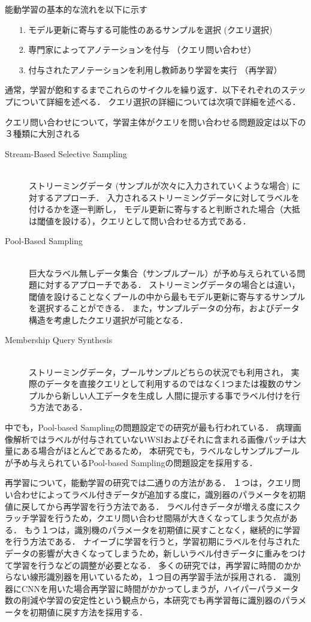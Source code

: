 能動学習の基本的な流れを以下に示す
\begin{itemize}
    \item[1.] モデル更新に寄与する可能性のあるサンプルを選択 (クエリ選択)
    \item[2.] 専門家によってアノテーションを付与 （クエリ問い合わせ）
    \item[3.] 付与されたアノテーションを利用し教師あり学習を実行 （再学習）
\end{itemize}
通常，学習が飽和するまでこれらのサイクルを繰り返す．以下それぞれのステップについて詳細を述べる．
クエリ選択の詳細については次項で詳細を述べる． 

クエリ問い合わせについて，学習主体がクエリを問い合わせる問題設定は以下の３種類に大別される
\begin{description}
    \item[Stream-Based Selective Sampling]\mbox{}\\
        ストリーミングデータ (サンプルが次々に入力されていくような場合) に対するアプローチ．
        入力されるストリーミングデータに対してラベルを付けるかを逐一判断し，
        モデル更新に寄与すると判断された場合（大抵は閾値を設ける），クエリとして問い合わせる方式である．
    \item[Pool-Based Sampling]\mbox{}\\
        巨大なラベル無しデータ集合（サンプルプール）が予め与えられている問題に対するアプローチである．
        ストリーミングデータの場合とは違い，閾値を設けることなくプールの中から最もモデル更新に寄与するサンプルを選択することができる．
        また，サンプルデータの分布，およびデータ構造を考慮したクエリ選択が可能となる．
    \item[Membership Query Synthesis]\mbox{}\\ 
        ストリーミングデータ，プールサンプルどちらの状況でも利用され，
        実際のデータを直接クエリとして利用するのではなく1つまたは複数のサンプルから新しい人工データを生成し
        人間に提示する事でラベル付けを行う方法である．
\end{description}
中でも，Pool-based Samplingの問題設定での研究が最も行われている．
病理画像解析ではラベルが付与されていないWSIおよびそれに含まれる画像パッチは大量にある場合がほとんどであるため，
本研究でも，ラベルなしサンプルプールが予め与えられているPool-based Samplingの問題設定を採用する．

再学習について，能動学習の研究では二通りの方法がある．
１つは，クエリ問い合わせによってラベル付きデータが追加する度に，識別器のパラメータを初期値に戻してから再学習を行う方法である．
ラベル付きデータが増える度にスクラッチ学習を行うため，クエリ問い合わせ間隔が大きくなってしまう欠点がある．
もう１つは，識別機のパラメータを初期値に戻すことなく，継続的に学習を行う方法である．
ナイーブに学習を行うと，学習初期にラベルを付与されたデータの影響が大きくなってしまうため，新しいラベル付きデータに重みをつけて学習を行うなどの調整が必要となる．
多くの研究では，再学習に時間のかからない線形識別器を用いているため，１つ目の再学習手法が採用される．
識別器にCNNを用いた場合再学習に時間がかかってしまうが，ハイパーパラメータ数の削減や学習の安定性という観点から，本研究でも再学習毎に識別器のパラメータを初期値に戻す方法を採用する．

